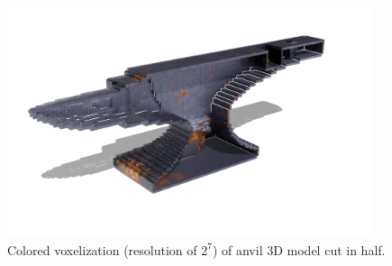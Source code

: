\begin{figure}[htp]
    \centering
    \includegraphics[width=0.95\textwidth]{sections/result/figures/anvil-voxelized-clipped-v1-color-128.png}
    \caption{Colored voxelization (resolution of $2^7$) of anvil 3D model cut in half.}
    \label{fig:result-anvil-voxelization-cut}
\end{figure}

\clearpage

